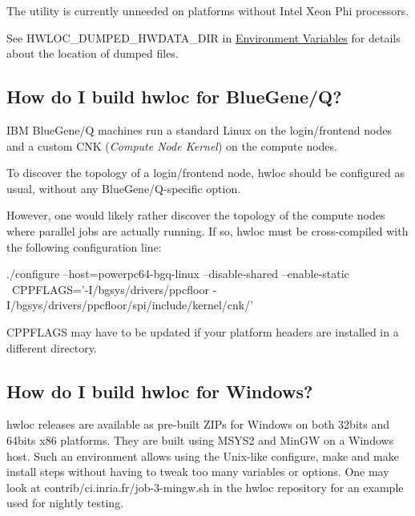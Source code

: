 The utility is currently unneeded on platforms without Intel Xeon Phi processors.

See {\ttfamily H\+W\+L\+O\+C\+\_\+\+D\+U\+M\+P\+E\+D\+\_\+\+H\+W\+D\+A\+T\+A\+\_\+\+D\+IR} in \hyperlink{a00382}{Environment Variables} for details about the location of dumped files.\hypertarget{a00394_faq_bgq}{}\subsection{How do I build hwloc for Blue\+Gene/\+Q?}\label{a00394_faq_bgq}
I\+BM Blue\+Gene/Q machines run a standard Linux on the login/frontend nodes and a custom C\+NK ({\itshape Compute Node Kernel}) on the compute nodes.

To discover the topology of a login/frontend node, hwloc should be configured as usual, without any Blue\+Gene/\+Q-\/specific option.

However, one would likely rather discover the topology of the compute nodes where parallel jobs are actually running. If so, hwloc must be cross-\/compiled with the following configuration line\+: \begin{DoxyVerb}./configure --host=powerpc64-bgq-linux --disable-shared --enable-static \
  CPPFLAGS='-I/bgsys/drivers/ppcfloor -I/bgsys/drivers/ppcfloor/spi/include/kernel/cnk/'
\end{DoxyVerb}


C\+P\+P\+F\+L\+A\+GS may have to be updated if your platform headers are installed in a different directory.\hypertarget{a00394_faq_windows}{}\subsection{How do I build hwloc for Windows?}\label{a00394_faq_windows}
hwloc releases are available as pre-\/built Z\+I\+Ps for Windows on both 32bits and 64bits x86 platforms. They are built using M\+S\+Y\+S2 and Min\+GW on a Windows host. Such an environment allows using the Unix-\/like {\ttfamily configure}, {\ttfamily make} and {\ttfamily make install} steps without having to tweak too many variables or options. One may look at {\ttfamily contrib/ci.\+inria.\+fr/job-\/3-\/mingw.sh} in the hwloc repository for an example used for nightly testing.

